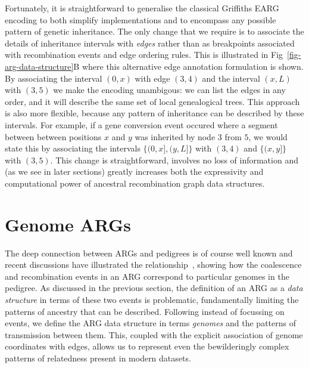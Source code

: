 \documentclass{article}
\begin{document}
Fortunately, it is straightforward to generalise the classical Griffiths
EARG encoding to both simplify implementations and to encompass any
possible pattern of genetic inheritance.
The only change that we require is to associate
the details of inheritance intervals with \emph{edges} rather than
as breakpoints associated with recombination events and
edge ordering rules. This is illustrated in Fig~\ref{fig-arg-data-structure}B
where this alternative edge annotation formulation is
shown. By associating the interval $(0, x)$ with edge $(3,4)$
and the interval $(x, L)$ with $(3, 5)$ we make the encoding
unambigous: we can list the edges in any order, and it
will describe the same set of local genealogical trees.
This approach is also more flexible, because any pattern
of inheritance can be described by these intervals. For
example, if a gene conversion event occured where a segment
between between positions $x$ and $y$ was inherited by
node $3$ from $5$, we would state this by associating
the intervals $\{(0, x], (y, L]\}$ with $(3,4)$ and
$\{(x, y]\}$ with $(3,5)$.
This change is straightforward, involves no loss of information
and (as we see in later sections)
greatly increases both the expressivity and computational
power of ancestral recombination graph data structures.

\section*{Genome ARGs}
The deep connection between ARGs and pedigrees is of course
well known
\citep[e.g.][]{wakeley2012genetics,gusfield2014recombinatorics,
speed2015naturereviewsgenetics}
and recent discussions have illustrated the
relationship~\citep{mathieson2020ancestry,brandt2021evaluation}, %
showing how the coalescence and recombination events in an ARG
correspond to particular genomes in the pedigree.
As discussed in the previous section, the definition of an ARG
as a \emph{data structure} in terms of these two events is problematic,
fundamentally limiting the patterns of ancestry that can be described.
Following \cite{mathieson2020ancestry} instead of focussing on events,
we define the ARG data structure in terms \emph{genomes} and the patterns of
transmission between them.
This, coupled with
the explicit association of genome coordinates with edges, allows
us to represent even the bewilderingly complex patterns of relatedness
present in modern datasets.
\end{document}
